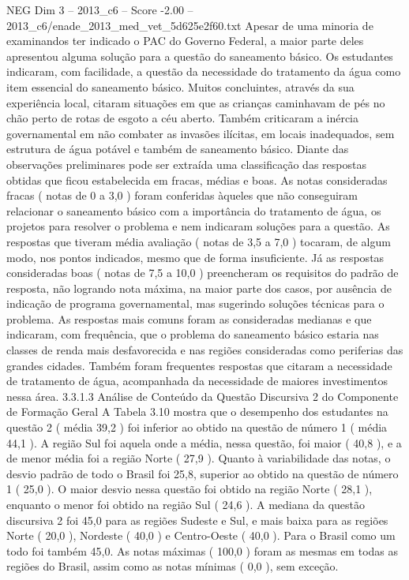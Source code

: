 \begin{textsample}{NEG Dim 3 – 2013\_c6 – Score -2.00 – 2013\_c6/enade\_2013\_med\_vet\_5d625e2f60.txt}
Apesar de uma minoria de examinandos ter indicado o PAC do Governo Federal, a maior parte deles apresentou alguma solução para a questão do saneamento básico.
Os estudantes indicaram, com facilidade, a questão da necessidade do tratamento da água como item essencial do saneamento básico.
Muitos concluintes, através da sua experiência local, citaram situações em que as crianças caminhavam de pés no chão perto de rotas de esgoto a céu aberto.
Também criticaram a inércia governamental em não combater as invasões ilícitas, em locais inadequados, sem estrutura de água potável e também de saneamento básico.
Diante das observações preliminares pode ser extraída uma classificação das respostas obtidas que ficou estabelecida em fracas, médias e boas.
As notas consideradas fracas ( notas de 0 a 3,0 ) foram conferidas àqueles que não conseguiram relacionar o saneamento básico com a importância do tratamento de água, os projetos para resolver o problema e nem indicaram soluções para a questão.
As respostas que tiveram média avaliação ( notas de 3,5 a 7,0 ) tocaram, de algum modo, nos pontos indicados, mesmo que de forma insuficiente.
Já as respostas consideradas boas ( notas de 7,5 a 10,0 ) preencheram os requisitos do padrão de resposta, não logrando nota máxima, na maior parte dos casos, por ausência de indicação de programa governamental, mas sugerindo soluções técnicas para o problema.
As respostas mais comuns foram as consideradas medianas e que indicaram, com frequência, que o problema do saneamento básico estaria nas classes de renda mais desfavorecida e nas regiões consideradas como periferias das grandes cidades.
Também foram frequentes respostas que citaram a necessidade de tratamento de água, acompanhada da necessidade de maiores investimentos nessa área. 3.3.1.3 Análise de Conteúdo da Questão Discursiva 2 do Componente de Formação Geral A Tabela 3.10 mostra que o desempenho dos estudantes na questão 2 ( média 39,2 ) foi inferior ao obtido na questão de número 1 ( média 44,1 ).
A região Sul foi aquela onde a média, nessa questão, foi maior ( 40,8 ), e a de menor média foi a região Norte ( 27,9 ).
Quanto à variabilidade das notas, o desvio padrão de todo o Brasil foi 25,8, superior ao obtido na questão de número 1 ( 25,0 ).
O maior desvio nessa questão foi obtido na região Norte ( 28,1 ), enquanto o menor foi obtido na região Sul ( 24,6 ).
A mediana da questão discursiva 2 foi 45,0 para as regiões Sudeste e Sul, e mais baixa para as regiões Norte ( 20,0 ), Nordeste ( 40,0 ) e Centro-Oeste ( 40,0 ).
Para o Brasil como um todo foi também 45,0.
As notas máximas ( 100,0 ) foram as mesmas em todas as regiões do Brasil, assim como as notas mínimas ( 0,0 ), sem exceção.

\end{textsample}
